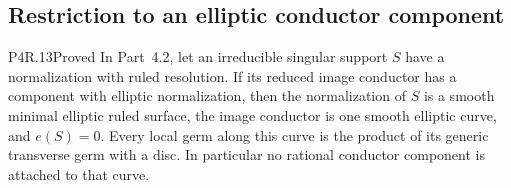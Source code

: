 \subsection{Restriction to an elliptic conductor component}

\begin{statement}{P4R.13}{Proved}
In Part~4.2, let an irreducible singular support $S$ have a
normalization with ruled resolution. If its reduced image
conductor has a component with elliptic normalization, then
the normalization of $S$ is a smooth minimal elliptic ruled
surface, the image conductor is one smooth elliptic curve,
and $e(S)=0$. Every local germ along this curve is the product
of its generic transverse germ with a disc. In particular no
rational conductor component is attached to that curve.
\end{statement}
